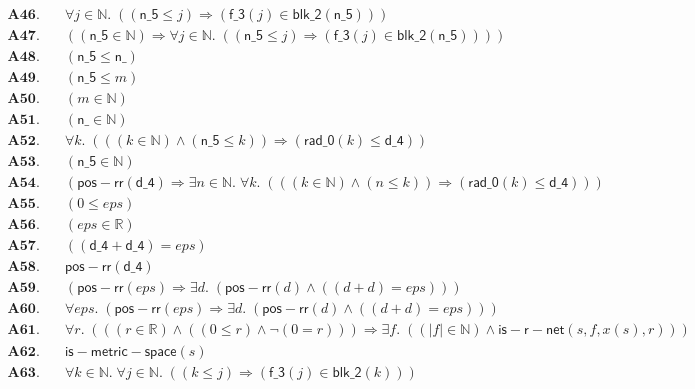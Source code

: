 \documentclass[11pt]{article}
\begin{document}
\begin{align*}
  \mathbf{A46.}\quad & \forall j \in \mathbb{N}.\; ((\mathsf{n\_5} \leq j) \Rightarrow (\mathsf{f\_3}(j) \in \mathsf{blk\_2}(\mathsf{n\_5}))) \\
  \mathbf{A47.}\quad & ((\mathsf{n\_5} \in \mathbb{N}) \Rightarrow \forall j \in \mathbb{N}.\; ((\mathsf{n\_5} \leq j) \Rightarrow (\mathsf{f\_3}(j) \in \mathsf{blk\_2}(\mathsf{n\_5})))) \\
  \mathbf{A48.}\quad & (\mathsf{n\_5} \leq \mathsf{n\_}) \\
  \mathbf{A49.}\quad & (\mathsf{n\_5} \leq m) \\
  \mathbf{A50.}\quad & (m \in \mathbb{N}) \\
  \mathbf{A51.}\quad & (\mathsf{n\_} \in \mathbb{N}) \\
  \mathbf{A52.}\quad & \forall k.\; (((k \in \mathbb{N}) \wedge (\mathsf{n\_5} \leq k)) \Rightarrow (\mathsf{rad\_0}(k) \leq \mathsf{d\_4})) \\
  \mathbf{A53.}\quad & (\mathsf{n\_5} \in \mathbb{N}) \\
  \mathbf{A54.}\quad & (\mathsf{pos{-}rr}(\mathsf{d\_4}) \Rightarrow \exists n \in \mathbb{N}.\; \forall k.\; (((k \in \mathbb{N}) \wedge (n \leq k)) \Rightarrow (\mathsf{rad\_0}(k) \leq \mathsf{d\_4}))) \\
  \mathbf{A55.}\quad & (0 \leq \mathit{eps}) \\
  \mathbf{A56.}\quad & (\mathit{eps} \in \mathbb{R}) \\
  \mathbf{A57.}\quad & ((\mathsf{d\_4} + \mathsf{d\_4}) = \mathit{eps}) \\
  \mathbf{A58.}\quad & \mathsf{pos{-}rr}(\mathsf{d\_4}) \\
  \mathbf{A59.}\quad & (\mathsf{pos{-}rr}(\mathit{eps}) \Rightarrow \exists d.\; (\mathsf{pos{-}rr}(d) \wedge ((d + d) = \mathit{eps}))) \\
  \mathbf{A60.}\quad & \forall \mathit{eps}.\; (\mathsf{pos{-}rr}(\mathit{eps}) \Rightarrow \exists d.\; (\mathsf{pos{-}rr}(d) \wedge ((d + d) = \mathit{eps}))) \\
  \mathbf{A61.}\quad & \forall r.\; (((r \in \mathbb{R}) \wedge ((0 \leq r) \wedge \neg (0 = r))) \Rightarrow \exists f.\; ((|f| \in \mathbb{N}) \wedge \mathsf{is{-}r{-}net}(s, f, x(s), r))) \\
  \mathbf{A62.}\quad & \mathsf{is{-}metric{-}space}(s) \\
  \mathbf{A63.}\quad & \forall k \in \mathbb{N}.\; \forall j \in \mathbb{N}.\; ((k \leq j) \Rightarrow (\mathsf{f\_3}(j) \in \mathsf{blk\_2}(k))) \\

\end{align*}
\end{document}
